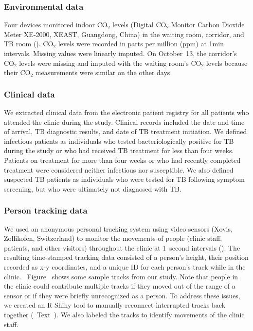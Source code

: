 \documentclass[fleqn,11pt]{wlscirep}
\begin{document}
\subsubsection{Environmental data}

Four devices monitored indoor CO$_2$ levels (Digital CO$_2$ Monitor Carbon Dioxide Meter XE-2000, XEAST, Guangdong, China) in the waiting room, corridor, and TB room (). CO$_2$ levels were recorded in parts per million (ppm) at 1min intervals. Missing values were linearly imputed. On October~13, the corridor's CO$_2$ levels were missing and imputed with the waiting room's CO$_2$ levels because their CO$_2$ measurements were similar on the other days.    

\subsubsection{Clinical data}

We extracted clinical data from the electronic patient registry for all patients who attended the clinic during the study. Clinical records included the date and time of arrival, TB diagnostic results, and date of TB treatment initiation. We defined infectious patients as individuals who tested bacteriologically positive for TB during the study or who had received TB treatment for less than four weeks. Patients on treatment for more than four weeks or who had recently completed treatment were considered neither infectious nor susceptible. We also defined suspected TB patients as individuals who were tested for TB following symptom screening, but who were ultimately not diagnosed with TB. 

\subsubsection{Person tracking data}

We used an anonymous personal tracking system using video sensors (Xovis, Zollikofen, Switzerland) to monitor the movements of people (clinic staff, patients, and other visitors) throughout the clinic at 1~second intervals (). The resulting time-stamped tracking data consisted of a person’s height, their position recorded as x-y coordinates, and a unique ID for each person's track while in the clinic. \supp~Figure~ shows some sample tracks from our study. Note that people in the clinic could contribute multiple tracks if they moved out of the range of a sensor or if they were briefly unrecognized as a person. To address these issues, we created an R Shiny tool to manually reconnect interrupted tracks back together (\supp~Text~). We also labeled the tracks to identify movements of the clinic staff.  
\end{document}
